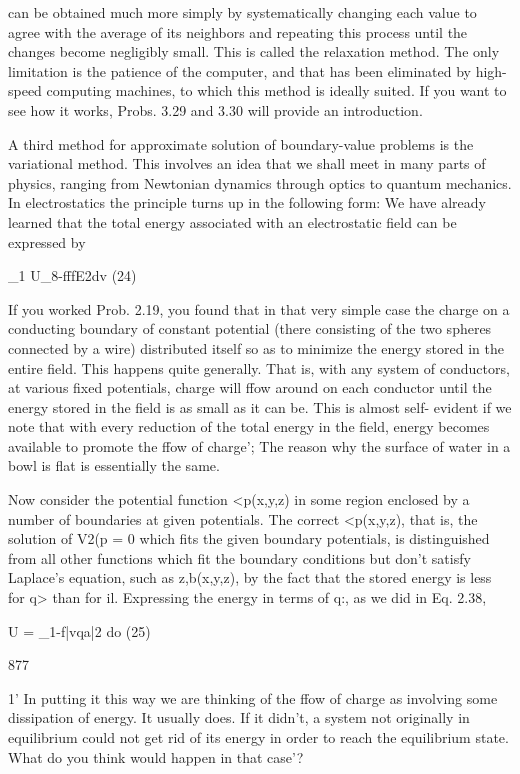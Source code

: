  

can be obtained much more simply by systematically changing each
value to agree with the average of its neighbors and repeating this
process until the changes become negligibly small. This is called
the relaxation method. The only limitation is the patience of the
computer, and that has been eliminated by high-speed computing
machines, to which this method is ideally suited. If you want to see
how it works, Probs. 3.29 and 3.30 will provide an introduction.

A third method for approximate solution of boundary-value problems
is the variational method. This involves an idea that we shall
meet in many parts of physics, ranging from Newtonian dynamics
through optics to quantum mechanics. In electrostatics the principle
turns up in the following form: We have already learned that
the total energy associated with an electrostatic field can be expressed
by

_1
U_8-fffE2dv (24)

If you worked Prob. 2.19, you found that in that very simple case
the charge on a conducting boundary of constant potential (there
consisting of the two spheres connected by a wire) distributed itself
so as to minimize the energy stored in the entire field. This happens
quite generally. That is, with any system of conductors, at various
fixed potentials, charge will ffow around on each conductor until the
energy stored in the field is as small as it can be. This is almost self-
evident if we note that with every reduction of the total energy in
the field, energy becomes available to promote the ffow of charge';
The reason why the surface of water in a bowl is flat is essentially
the same.

Now consider the potential function <p(x,y,z) in some region enclosed
by a number of boundaries at given potentials. The correct
<p(x,y,z), that is, the solution of V2(p = 0 which fits the given boundary
potentials, is distinguished from all other functions which fit the
boundary conditions but don't satisfy Laplace's equation, such as
z,b(x,y,z), by the fact that the stored energy is less for q> than for il.
Expressing the energy in terms of q:, as we did in Eq. 2.38,

U = _1-f|vqa|2 do (25)

877

1' In putting it this way we are thinking of the ffow of charge as involving some dissipation
of energy. It usually does. If it didn't, a system not originally in equilibrium could
not get rid of its energy in order to reach the equilibrium state. What do you think would
happen in that case'?

